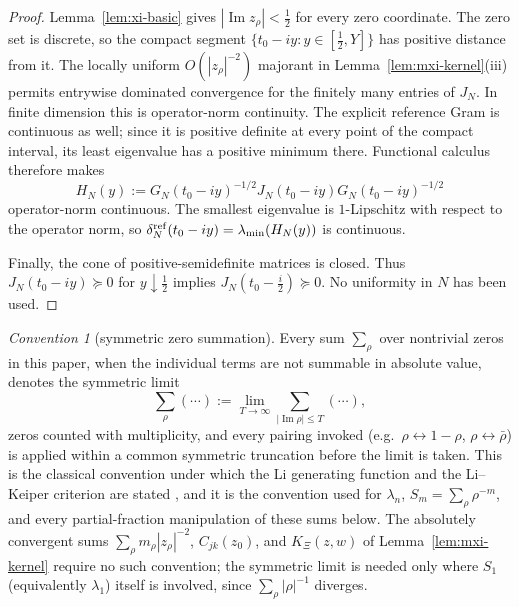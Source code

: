 \documentclass[11pt]{amsart}
\theoremstyle{definition}
\theoremstyle{remark}
\newtheorem{convention}[theorem]{Convention}
\theoremstyle{definition}
\renewcommand{\Im}{\operatorname{Im}}
\newcommand{\half}{\tfrac{1}{2}}
\begin{document}
\begin{proof}
Lemma~\ref{lem:xi-basic} gives $|\Im z_\rho|<\half$ for every zero coordinate.  The zero set is discrete,
so the compact segment $\{t_0-iy:y\in[\half,Y]\}$ has positive distance from it.  The locally uniform
$O(|z_\rho|^{-2})$ majorant in Lemma~\ref{lem:mxi-kernel}(iii) permits entrywise dominated convergence
for the finitely many entries of $J_N$.  In finite dimension this is operator-norm continuity.  The
explicit reference Gram is continuous as well; since it is positive definite at every point of the
compact interval, its least eigenvalue has a positive minimum there.  Functional calculus therefore
makes
\[
   H_N(y):=G_N(t_0-iy)^{-1/2}J_N(t_0-iy)G_N(t_0-iy)^{-1/2}
\]
operator-norm continuous.  The smallest eigenvalue is $1$-Lipschitz with respect to the operator norm,
so $\delta_N^{\rm ref}(t_0-iy)=\lambda_{\min}(H_N(y))$ is continuous.

Finally, the cone of positive-semidefinite matrices is closed.  Thus
$J_N(t_0-iy)\succeq0$ for $y\downarrow\half$ implies
$J_N(t_0-\tfrac i2)\succeq0$.  No uniformity in $N$ has been used.
\end{proof}

\begin{convention}[symmetric zero summation]\label{conv:symmetric-sum}
Every sum $\sum_\rho$ over nontrivial zeros in this paper, when the individual terms are not summable
in absolute value, denotes the symmetric limit
\[
   \sum_\rho(\cdots)
   :=
   \lim_{T\to\infty}\sum_{|\Im\rho|\le T}(\cdots),
\]
zeros counted with multiplicity, and every pairing invoked (e.g.\ $\rho\leftrightarrow1-\rho$,
$\rho\leftrightarrow\bar\rho$) is applied within a common symmetric truncation before the limit is
taken.  This is the classical convention under which the Li generating function and the Li--Keiper
criterion are stated \cite{Li,Keiper1992,BombieriLagarias1999}, and it is the convention used for
$\lambda_n$, $S_m=\sum_\rho\rho^{-m}$, and every partial-fraction manipulation of these sums below.  The
absolutely convergent sums $\sum_\rho m_\rho|z_\rho|^{-2}$, $C_{jk}(z_0)$, and $K_\Xi(z,w)$ of
Lemma~\ref{lem:mxi-kernel} require no such convention; the symmetric limit is needed only where $S_1$
(equivalently $\lambda_1$) itself is involved, since $\sum_\rho|\rho|^{-1}$ diverges.
\end{convention}
\end{document}
